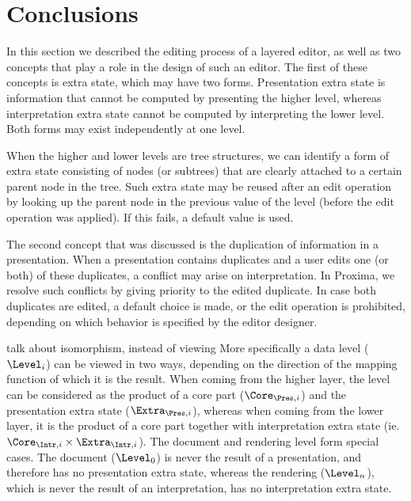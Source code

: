 \section{Conclusions}

In this section we described the editing process of a layered editor, as well as two concepts that play a role in the design of such an editor. The first of these concepts is extra state, which may have two forms. Presentation extra state is information that cannot be computed by presenting the higher level, whereas interpretation extra state cannot be computed by interpreting the lower level. Both forms may exist independently at one level.

When the higher and lower levels are tree structures, we can identify a form of extra state consisting of nodes (or subtrees) that are clearly attached to a certain parent node in the tree. Such extra state may be reused after an edit operation by looking up the parent node in the previous value of the level (before the edit operation was applied). If this fails, a default value is used.


The second concept that was discussed is the duplication of information in a presentation. When a presentation contains duplicates and a user edits one (or both) of these duplicates, a conflict may arise on interpretation. In Proxima, we resolve such conflicts by giving priority to the edited duplicate. In case both duplicates are edited, a default choice is made, or the edit operation is prohibited, depending on which behavior is specified by the editor designer.




\bc
\toHere
talk about isomorphism, instead of viewing
\fromHere
More specifically a data level ($\Level_{i}$) can be viewed in two ways, depending on the direction of the mapping function of which it is the result. When coming from the higher layer, the level can be considered as the product of a core part ($\Core_{\Pres,i}$) and the presentation extra state ($\Extra_{\Pres,i}$), whereas when coming from the lower layer, it is the product of a core part together with interpretation extra state (ie. $\Core_{\Intr,i} \times \Extra_{\Intr,i}$). The document and rendering level form special cases. The document ($\Level_0$) is never the result of a presentation, and therefore has no presentation extra state, whereas the rendering ($\Level_n$), which is never the result of an interpretation, has no interpretation extra state.

